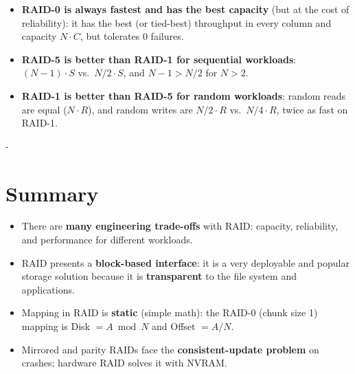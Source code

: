 \documentclass[11pt,a4paper]{article}
\makeatletter
\newcommand{\keepspace}[1]{\par\penalty-100\begingroup
  \setlength{\dimen@}{#1}\dimen@ii\pagegoal\advance\dimen@ii-\pagetotal
  \ifdim\dimen@>\dimen@ii\ifdim\dimen@ii>\z@\vfil\fi\break\fi\endgroup}
\makeatother
\begin{document}
\begin{keybox}[Takeaways]
\begin{itemize}
  \item \textbf{RAID-0 is always fastest and has the best capacity} (but at
        the cost of reliability): it has the best (or tied-best) throughput
        in every column and capacity \(N\cdot C\), but tolerates 0 failures.
  \item \textbf{RAID-5 is better than RAID-1 for sequential workloads}:
        \((N-1)\cdot S\) vs.\ \(N/2\cdot S\), and \(N-1 > N/2\) for \(N>2\).
  \item \textbf{RAID-1 is better than RAID-5 for random workloads}: random
        reads are equal (\(N\cdot R\)), and random writes are \(N/2\cdot R\)
        vs.\ \(N/4\cdot R\), twice as fast on RAID-1.
\end{itemize}
\end{keybox}

\keepspace{9\baselineskip}
\section{Summary}

\begin{keybox}[Summary]
\begin{itemize}
  \item There are \textbf{many engineering trade-offs} with RAID: capacity,
        reliability, and performance for different workloads.
  \item RAID presents a \textbf{block-based interface}: it is a very
        deployable and popular storage solution because it is
        \textbf{transparent} to the file system and applications.
  \item Mapping in RAID is \textbf{static} (simple math): the RAID-0
        (chunk size 1) mapping is Disk \(= A \bmod N\) and Offset \(= A / N\).
  \item Mirrored and parity RAIDs face the \textbf{consistent-update
        problem} on crashes; hardware RAID solves it with NVRAM.
\end{itemize}
\end{keybox}
\end{document}
